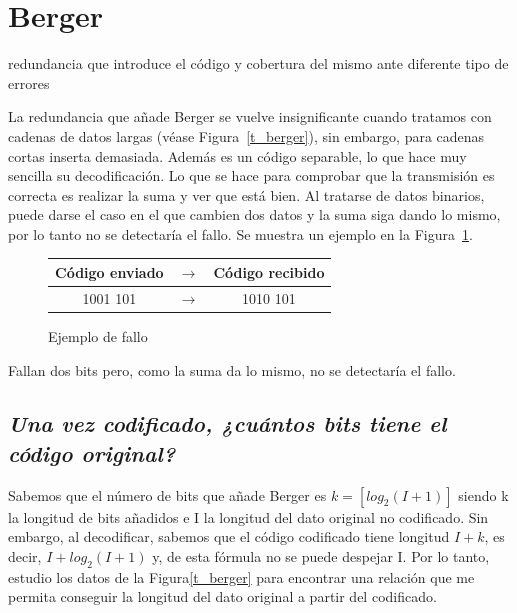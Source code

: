 \documentclass[a4paper]{article}
\begin{document}
\section{Berger}
redundancia que introduce el código y cobertura del mismo ante diferente tipo de errores

	La redundancia que añade Berger se vuelve insignificante cuando tratamos con cadenas de datos largas (véase Figura~\ref{t_berger}), sin embargo, para cadenas cortas inserta demasiada. Además es un código separable, lo que hace muy sencilla su decodificación.
	Lo que se hace para comprobar que la transmisión es correcta es realizar la suma y ver que está bien. Al tratarse de datos binarios, puede darse el caso en el que cambien dos datos y la suma siga dando lo mismo, por lo tanto no se detectaría el fallo. Se muestra un ejemplo en la Figura~\ref{ej_berger}.
	\begin{figure}[h!]
		\centering
		\begin{tabular}{| c | c | c |}
				
			\hline
			
			Código enviado & $\rightarrow$ & Código recibido \\
			\hline
			\rowcolor{LightCyan}
			1001 101 & $\rightarrow$ & 1010 101 \\ 
			\hline
				
		\end{tabular}

		\label{ej_berger}
		\caption{Ejemplo de fallo}
	\end{figure}
	Fallan dos bits pero, como la suma da lo mismo, no se detectaría el fallo.
	\subsection{\emph{Una vez codificado, ¿cuántos bits tiene el código original?}}
	Sabemos que el número de bits que añade Berger es $k = [log_2(I+1)]$ siendo k la longitud de bits añadidos e I la longitud del dato original no codificado. Sin embargo, al decodificar, sabemos que el código codificado tiene longitud $I + k$, es decir, $I + log_2(I+1)$ y, de esta fórmula no se puede despejar I. 
	Por lo tanto, estudio los datos de la Figura\ref{t_berger} para encontrar una relación que me permita conseguir la longitud del dato original a partir del codificado.
	
\end{document}
